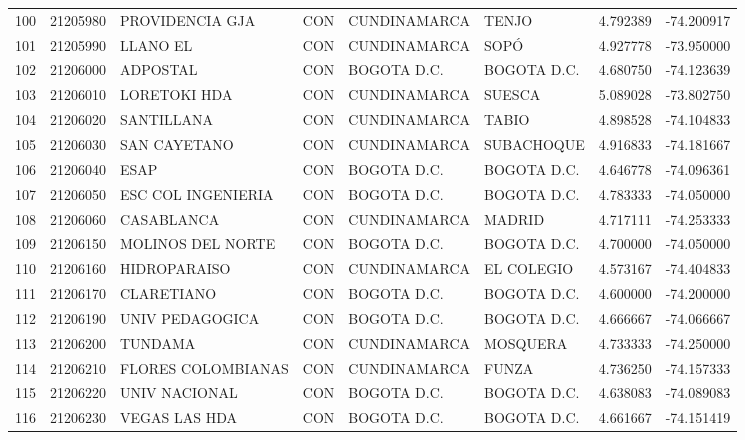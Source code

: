 \documentclass[11pt]{article}
\begin{document}
\begin{table}
\begin{tabular}{lrllllrr}
100 &  21205980 &           PROVIDENCIA GJA &  CON &  CUNDINAMARCA &             TENJO &  4.792389 & -74.200917 \\
101 &  21205990 &                 LLANO EL  &  CON &  CUNDINAMARCA &              SOPÓ &  4.927778 & -73.950000 \\
102 &  21206000 &                 ADPOSTAL  &  CON &   BOGOTA D.C. &       BOGOTA D.C. &  4.680750 & -74.123639 \\
103 &  21206010 &             LORETOKI HDA  &  CON &  CUNDINAMARCA &            SUESCA &  5.089028 & -73.802750 \\
104 &  21206020 &            SANTILLANA     &  CON &  CUNDINAMARCA &             TABIO &  4.898528 & -74.104833 \\
105 &  21206030 &             SAN CAYETANO  &  CON &  CUNDINAMARCA &        SUBACHOQUE &  4.916833 & -74.181667 \\
106 &  21206040 &                     ESAP  &  CON &   BOGOTA D.C. &       BOGOTA D.C. &  4.646778 & -74.096361 \\
107 &  21206050 &        ESC COL INGENIERIA &  CON &   BOGOTA D.C. &       BOGOTA D.C. &  4.783333 & -74.050000 \\
108 &  21206060 &               CASABLANCA  &  CON &  CUNDINAMARCA &            MADRID &  4.717111 & -74.253333 \\
109 &  21206150 &         MOLINOS DEL NORTE &  CON &   BOGOTA D.C. &       BOGOTA D.C. &  4.700000 & -74.050000 \\
110 &  21206160 &             HIDROPARAISO  &  CON &  CUNDINAMARCA &        EL COLEGIO &  4.573167 & -74.404833 \\
111 &  21206170 &               CLARETIANO  &  CON &   BOGOTA D.C. &       BOGOTA D.C. &  4.600000 & -74.200000 \\
112 &  21206190 &           UNIV PEDAGOGICA &  CON &   BOGOTA D.C. &       BOGOTA D.C. &  4.666667 & -74.066667 \\
113 &  21206200 &                  TUNDAMA  &  CON &  CUNDINAMARCA &          MOSQUERA &  4.733333 & -74.250000 \\
114 &  21206210 &        FLORES COLOMBIANAS &  CON &  CUNDINAMARCA &             FUNZA &  4.736250 & -74.157333 \\
115 &  21206220 &             UNIV NACIONAL &  CON &   BOGOTA D.C. &       BOGOTA D.C. &  4.638083 & -74.089083 \\
116 &  21206230 &             VEGAS LAS HDA &  CON &   BOGOTA D.C. &       BOGOTA D.C. &  4.661667 & -74.151419 \\

\end{tabular}
\end{table}
\end{document}
